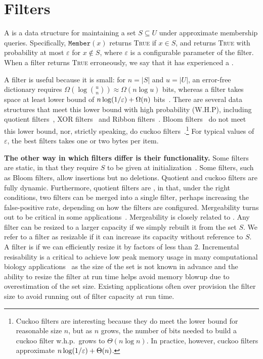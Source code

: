 
\section{Filters}

A  is a data structure for maintaining a set $S\subseteq U$ under approximate membership queries. Specifically, $\texttt{Member}(x)$ returns \textsc{True} if $x\in S$, and returns \textsc{True} with probability at most $\varepsilon$ for $x\notin S$, where $\varepsilon$ is a configurable parameter of the filter.  When a filter returns \textsc{True} erroneously, we say that it has experienced a .

A filter is useful because it is small: for $n= |S|$ and $u = |U|$, an error-free dictionary requires $\Omega(\log {u\choose n}) \approx \Omega(n \log u)$ bits, whereas a filter  takes space at least  lower bound of $n\log (1/\varepsilon) + \Omega(n)$ bits~\cite{CarterFG78}.  There are several data structures that meet this lower bound with high probability (W.H.P), including quotient filters~\cite{Cleary84,PaghPaRa05,DillingerM09,BenderFaJo12a,PandeyBJP17,PandeyCDBFJ21}, XOR filters~\cite{GrafLe20} and Ribbon filters~\cite{DillingerW21}.  Bloom filters~\cite{Bloom70} do not meet this lower bound, nor, strictly speaking, do cuckoo filters~\cite{FanAnKa14,BreslowJ18}.\footnote{Cuckoo filters are interesting because they do meet the lower bound for reasonable size $n$, but as $n$ grows, the number of bits needed to build a cuckoo filter w.h.p.\ grows to $\Theta(n\log n)$.  In practice, however, cuckoo filters approximate $n\log (1/\varepsilon) + \Theta(n)$.}
%
For typical values of $\varepsilon$, the best filters takes one or two bytes per item.

\noindent
{\bf The other way in which filters differ is their functionality.} Some filters are static, in that they require $S$ to be given at initialization~\cite{GrafL19,DillingerW21}.  Some filters, such as Bloom filters, allow insertions but no deletions.  Quotient and cuckoo filters are fully dynamic.  Furthermore, quotient filters are , in that, under the right conditions, two filters can be merged into a single filter, perhaps increasing the false-positive rate, depending on how the filters are configured.  Mergeability turns out to be critical in some applications~\cite{conway2020splinterdb,PandeyABFJP18Cell}. Mergeability is closely related to .  Any filter can be resized to a larger capacity if we  simply rebuilt it from the set $S$.  We refer to a filter as resizable if it can increase its capacity without reference to $S$.  A filter is  if we can efficiently resize it by factors of less than 2.  Incremental resisability is a critical to achieve low peak memory usage in many computational biology applications~\cite{hofmeyr2020terabase,PandeyBeJo17a,PandeyBeJo17b,MarccaisKi11,wood2014kraken,wood2019improved} as the size of the set is not known in advance and the ability to resize the filter at run time helps avoid memory blowup due to overestimation of the set size. Existing applications often over provision the filter size to avoid running out of filter capacity at run time.

